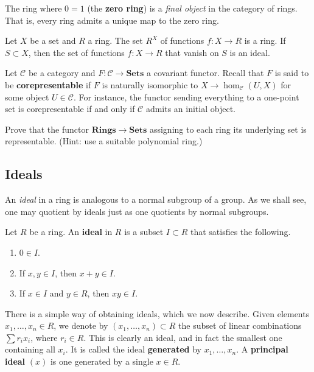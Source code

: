 \begin{exercise} 
The ring where $0=1$ (the \textbf{zero ring}) is a \emph{final object} in the category of rings. That
is, every ring admits a unique map to the zero ring.	
\end{exercise} 

\begin{exercise} 
Let $X$ be a set and $R$ a ring. The set $R^X$ of functions $f:X \to R$ is a
ring. If $S \subset X$, then the set of functions $f: X \to R$ that vanish on
$S$ is an ideal.
\end{exercise}

\begin{exercise}
\label{corepresentable}
Let $\mathcal{C}$ be a category and $F: \mathcal{C} \to \mathbf{Sets}$  a
covariant functor. Recall that $F$ is said to be \textbf{corepresentable} if
$F$ is naturally isomorphic to $X \to \hom_{\mathcal{C}}(U, X)$ for some
object $U \in \mathcal{C}$. For instance, the functor sending everything to a
one-point set is corepresentable if and only if $\mathcal{C}$ admits an
initial object.

Prove that the functor  $\mathbf{Rings} \to \mathbf{Sets}$ assigning to each ring its underlying set is
representable. (Hint: use a suitable polynomial ring.)
\end{exercise} 


\subsection{Ideals}

An \emph{ideal} in a ring is  analogous to a normal subgroup of a
group. As we shall see, one may quotient by ideals just as one quotients by
normal subgroups. 

\begin{definition}
Let $R$ be a ring.  An \textbf{ideal} in $R$ is a subset $I \subset R$ that
satisfies the following.

\begin{enumerate}
  \item $0 \in I$.
  \item If $x, y \in I$, then $x + y \in I$.
  \item If $x \in I$ and $y \in R$, then $xy \in I$.
\end{enumerate}
\end{definition}

There is a simple way of obtaining ideals, which we now describe.
Given elements $x_1, \ldots, x_n \in R$, we denote by $(x_1, \ldots, x_n) \subset
R$ the subset of linear combinations $\sum r_i x_i$, where $r_i \in R$.  This
is clearly an ideal, and in fact the smallest one containing all $x_i$.  It is
called the ideal \textbf{generated} by $x_1, \ldots, x_n$.  A
\textbf{principal ideal} $(x)$ is one generated by a single $x \in R$.

